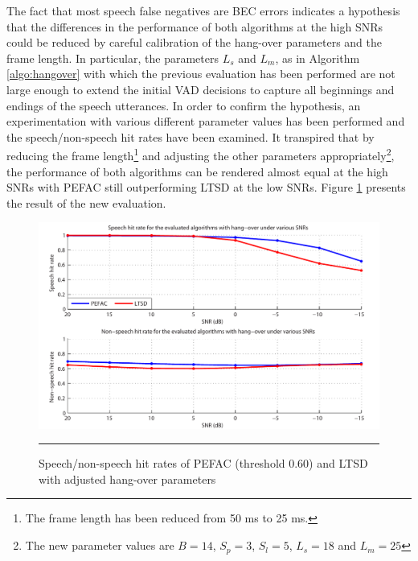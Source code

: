 The fact that most speech false negatives are BEC errors indicates a hypothesis that the differences in the performance of both algorithms at the high SNRs could be reduced by careful calibration of the hang-over parameters and the frame length. In particular, the parameters $L_s$ and $L_m$, as in Algorithm \ref{algo:hangover} with which the previous evaluation has been performed are not large enough to extend the initial VAD decisions to capture all beginnings and endings of the speech utterances. In order to confirm the hypothesis, an experimentation with various different parameter values has been performed and the speech/non-speech hit rates have been examined. It transpired that by reducing the frame length\footnote{The frame length has been reduced from 50 ms to 25 ms.} and adjusting the other parameters appropriately\footnote{The new parameter values are $B=14$, $S_p=3$, $S_l=5$, $L_s=18$ and $L_m=25$}, the performance of both algorithms can be rendered almost equal at the high SNRs with PEFAC still outperforming LTSD at the low SNRs. Figure \ref{fig:diffhangpars} presents the result of the new evaluation.

\begin{figure}[htbp]
	\centering
		\includegraphics[width=0.9\columnwidth]{Figures/Chapter5/diffhangpars.pdf}
		\rule{37em}{0.5pt}
	\caption[Speech/non-speech hit rates of PEFAC (threshold 0.60) and LTSD with adjusted hang-over parameters]{Speech/non-speech hit rates of PEFAC (threshold 0.60) and LTSD with adjusted hang-over parameters}
	\label{fig:diffhangpars}
\end{figure}


